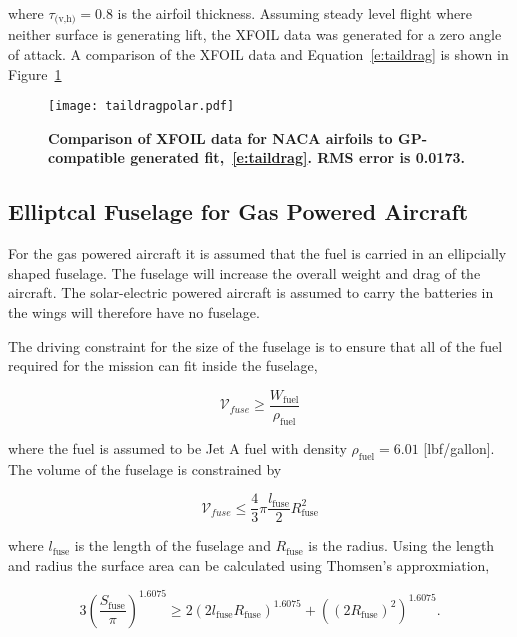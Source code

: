 \documentclass[]{aiaa-tc}%
\begin{document}
where $\tau_{\text{(v,h)}} = 0.8$ is the airfoil thickness. Assuming steady level flight where neither surface is generating lift, the XFOIL data was generated for a zero angle of attack. A comparison of the XFOIL data and Equation~\eqref{e:taildrag} is shown in Figure~\ref{f:taildragpolar}

\begin{figure}[H]
	\begin{center}
	\texttt{[image: taildragpolar.pdf]}
    \caption{ \textbf{Comparison of XFOIL data for NACA airfoils to GP-compatible generated fit,~\eqref{e:taildrag}. RMS error is 0.0173.}}
	\label{f:taildragpolar}
	\end{center}
\end{figure}

\subsection{Elliptcal Fuselage for Gas Powered Aircraft}

For the gas powered aircraft it is assumed that the fuel is carried in an ellipcially shaped fuselage.  The fuselage will increase the overall weight and drag of the aircraft.  The solar-electric powered aircraft is assumed to carry the batteries in the wings will therefore have no fuselage.  

The driving constraint for the size of the fuselage is to ensure that all of the fuel required for the mission can fit inside the fuselage, 

\begin{equation}
    \label{e:fusevol}
    \mathcal{V}_{fuse} \geq \frac{W_\text{fuel}}{\rho_\text{fuel}}
\end{equation}

where the fuel is assumed to be Jet A fuel with density $\rho_\text{fuel} = 6.01$ [lbf/gallon].  The volume of the fuselage is constrained by

\begin{equation}
    \label{e:fusevol2}
    \mathcal{V}_{fuse} \leq \frac{4}{3}\pi \frac{l_{\text{fuse}}}{2}R_{\text{fuse}}^2
\end{equation}

where $l_{\text{fuse}}$ is the length of the fuselage and $R_{\text{fuse}}$ is the radius. Using the length and radius the surface area can be calculated using Thomsen's approxmiation,\cite{ellipsoidSA}

\begin{equation}
    \label{e:fusesa}
    3 \left( \frac{S_{\text{fuse}}}{\pi} \right)^{1.6075} \geq 2(2l_{\text{fuse}}R_{\text{fuse}})^{1.6075} + ((2R_{\text{fuse}})^2)^{1.6075}.
\end{equation}
\end{document}
